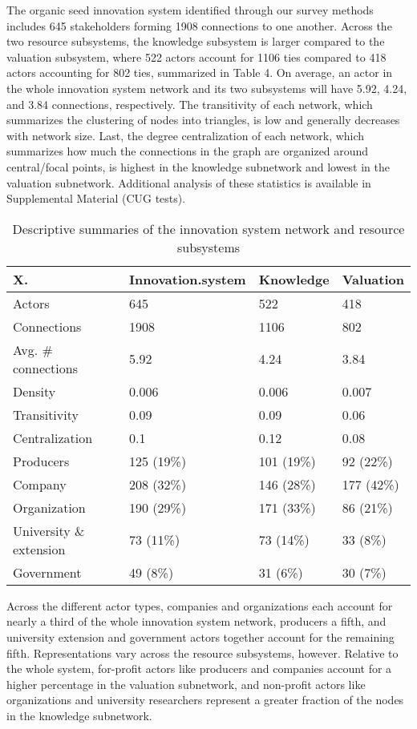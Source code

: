 \documentclass[twoside,12pt,final]{ucthesis-CA2012}
\begin{document}
\begin{ucmainmatter}
The organic seed innovation system identified through our survey methods
includes 645 stakeholders forming 1908 connections to one another.
Across the two resource subsystems, the knowledge subsystem is larger
compared to the valuation subsystem, where 522 actors account for 1106
ties compared to 418 actors accounting for 802 ties, summarized in Table
4. On average, an actor in the whole innovation system network and its
two subsystems will have 5.92, 4.24, and 3.84 connections, respectively.
The transitivity of each network, which summarizes the clustering of
nodes into triangles, is low and generally decreases with network size.
Last, the degree centralization of each network, which summarizes how
much the connections in the graph are organized around central/focal
points, is highest in the knowledge subnetwork and lowest in the
valuation subnetwork. Additional analysis of these statistics is
available in Supplemental Material (CUG tests).
\begin{table}

\caption{\label{tab:unnamed-chunk-5}Descriptive summaries of the innovation system network and resource subsystems}
\centering
\begin{tabular}[t]{llll}
\toprule
X. & Innovation.system & Knowledge & Valuation\\
\midrule
Actors & 645 & 522 & 418\\
Connections & 1908 & 1106 & 802\\
Avg. \# connections & 5.92 & 4.24 & 3.84\\
Density & 0.006 & 0.006 & 0.007\\
Transitivity & 0.09 & 0.09 & 0.06\\
\addlinespace
Centralization & 0.1 & 0.12 & 0.08\\
Producers & 125 (19\%) & 101 (19\%) & 92 (22\%)\\
Company & 208 (32\%) & 146 (28\%) & 177 (42\%)\\
Organization & 190 (29\%) & 171 (33\%) & 86 (21\%)\\
University \&
extension & 73 (11\%) & 73 (14\%) & 33 (8\%)\\
\addlinespace
Government & 49 (8\%) & 31 (6\%) & 30 (7\%)\\
\bottomrule
\end{tabular}
\end{table}
Across the different actor types, companies and organizations each
account for nearly a third of the whole innovation system network,
producers a fifth, and university extension and government actors
together account for the remaining fifth. Representations vary across
the resource subsystems, however. Relative to the whole system,
for-profit actors like producers and companies account for a higher
percentage in the valuation subnetwork, and non-profit actors like
organizations and university researchers represent a greater fraction of
the nodes in the knowledge subnetwork.


\end{ucmainmatter}
\end{document}
